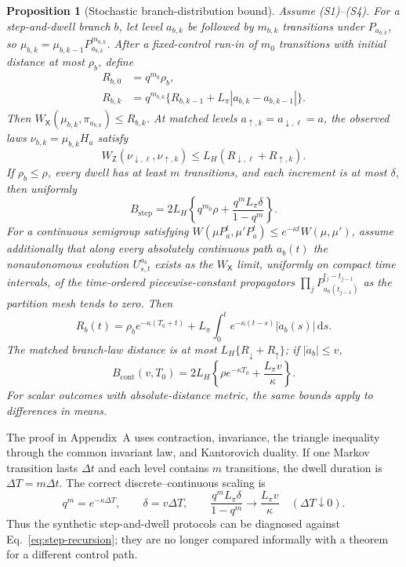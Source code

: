 \documentclass[pdflatex,sn-mathphys-num]{sn-jnl}
\newcommand{\dd}{\mathrm{d}}
\newtheorem{proposition}{Proposition}
\begin{document}
\begin{proposition}[Stochastic branch-distribution bound]
\label{prop:stochastic-rate-separation}
Assume (S1)--(S4). For a step-and-dwell branch $b$, let level $a_{b,k}$ be followed by $m_{b,k}$ transitions under $P_{a_{b,k}}$, so $\mu_{b,k}=\mu_{b,k-1}P_{a_{b,k}}^{m_{b,k}}$. After a fixed-control run-in of $m_0$ transitions with initial distance at most $\rho_b$, define
\begin{align}
R_{b,0}&=q^{m_0}\rho_b,\\
R_{b,k}&=q^{m_{b,k}}\{R_{b,k-1}+L_\pi|a_{b,k}-a_{b,k-1}|\}.
\label{eq:step-recursion}
\end{align}
Then $W_{\mathsf X}(\mu_{b,k},\pi_{a_{b,k}})\leq R_{b,k}$. At matched levels $a_{\uparrow,k}=a_{\downarrow,\ell}=a$, the observed laws $\nu_{b,k}=\mu_{b,k}H_a$ satisfy
\begin{equation}
W_{\mathsf Z}(\nu_{\downarrow,\ell},\nu_{\uparrow,k})
\leq L_H(R_{\downarrow,\ell}+R_{\uparrow,k}).
\label{eq:step-branch-bound}
\end{equation}
If $\rho_b\leq\rho$, every dwell has at least $m$ transitions, and each increment is at most $\delta$, then uniformly
\begin{equation}
B_{\mathrm{step}}=2L_H\!\left\{q^{m_0}\rho+
\frac{q^mL_\pi\delta}{1-q^m}\right\}.
\label{eq:step-uniform-bound}
\end{equation}
For a continuous semigroup satisfying $W(\mu P_a^t,\mu'P_a^t)\leq e^{-\kappa t}W(\mu,\mu')$, assume additionally that along every absolutely continuous path $a_b(t)$ the nonautonomous evolution $U_{s,t}^{a_b}$ exists as the $W_{\mathsf X}$ limit, uniformly on compact time intervals, of the time-ordered piecewise-constant propagators $\prod_jP_{a_b(t_{j-1})}^{t_j-t_{j-1}}$ as the partition mesh tends to zero. Then
\begin{equation}
R_b(t)=\rho_b e^{-\kappa(T_0+t)}+L_\pi\int_0^t e^{-\kappa(t-s)}|\dot a_b(s)|\,\dd s.
\end{equation}
The matched branch-law distance is at most $L_H\{R_\downarrow+R_\uparrow\}$; if $|\dot a_b|\leq v$,
\begin{equation}
B_{\mathrm{cont}}(v,T_0)=2L_H\!\left\{\rho e^{-\kappa T_0}+\frac{L_\pi v}{\kappa}\right\}.
\label{eq:continuous-bound}
\end{equation}
For scalar outcomes with absolute-distance metric, the same bounds apply to differences in means.
\end{proposition}

The proof in Appendix~A uses contraction, invariance, the triangle inequality through the common invariant law, and Kantorovich duality. If one Markov transition lasts $\Delta t$ and each level contains $m$ transitions, the dwell duration is $\Delta T=m\Delta t$. The correct discrete--continuous scaling is
\begin{equation}
q^m=e^{-\kappa\Delta T},\qquad \delta=v\Delta T,
\qquad
\frac{q^mL_\pi\delta}{1-q^m}\longrightarrow\frac{L_\pi v}{\kappa}
\quad(\Delta T\downarrow0).
\end{equation}
Thus the synthetic step-and-dwell protocols can be diagnosed against Eq.~\eqref{eq:step-recursion}; they are no longer compared informally with a theorem for a different control path.
\end{document}
